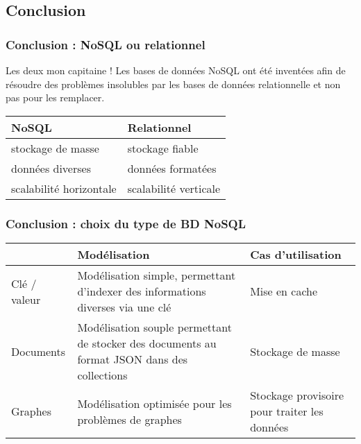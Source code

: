 	\subsection{Conclusion}
	\begin{frame}
		\frametitle{Conclusion : NoSQL ou relationnel}

		\begin{alertblock}{Les deux mon capitaine !}
			Les bases de données NoSQL ont été inventées afin de résoudre des problèmes insolubles par les bases de données relationnelle et non pas pour les remplacer.
		\end{alertblock}

		\vspace{20px}
		
		\begin{tabular}{|l|l|}
			\hline
			\textbf{NoSQL} & \textbf{Relationnel} \\ \hline\hline
			stockage de masse & stockage fiable \\ \hline
			données diverses & données formatées \\ \hline
			scalabilité horizontale & scalabilité verticale \\ \hline
		\end{tabular}

	\end{frame}

	\begin{frame}
		\frametitle{Conclusion : choix du type de BD NoSQL}

		\begin{tabular}{|p{}|p{}|p{0.30\textwidth}|}
			\hline
			& Modélisation & Cas d'utilisation \\\hline
			Clé / valeur
			& Modélisation simple, permettant d'indexer des informations diverses via une clé
			& Mise en cache  \\\hline
			Documents
			& Modélisation souple permettant de stocker des documents au format JSON dans des collections
			& Stockage de masse \\\hline
			Graphes
			& Modélisation optimisée pour les problèmes de graphes
			& Stockage provisoire pour traiter les données \\\hline
		\end{tabular}
	\end{frame}